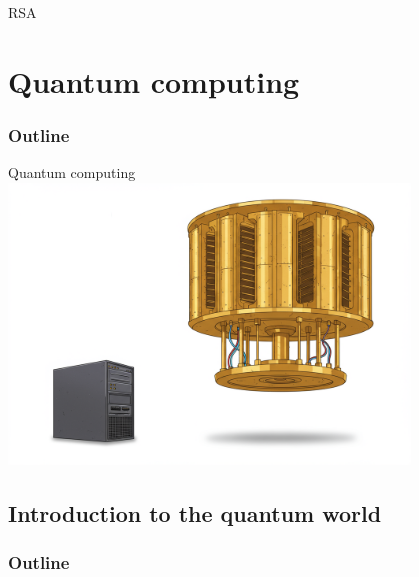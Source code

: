 \documentclass{beamer}
\begin{document}
\begin{frame}{RSA}
\begin{linenumbers}

\end{linenumbers}
\end{frame}

\section{Quantum computing}
\begin{frame}
  \frametitle{Outline}
  \tableofcontents[currentsection]
\end{frame}

\begin{frame}{Quantum computing}
	\centering
	\includegraphics[width=0.8\textwidth]{classical-vs-quantum.png}
\end{frame}

\subsection{Introduction to the quantum world}
\begin{frame}
  \frametitle{Outline}
\end{frame}
\end{document}
